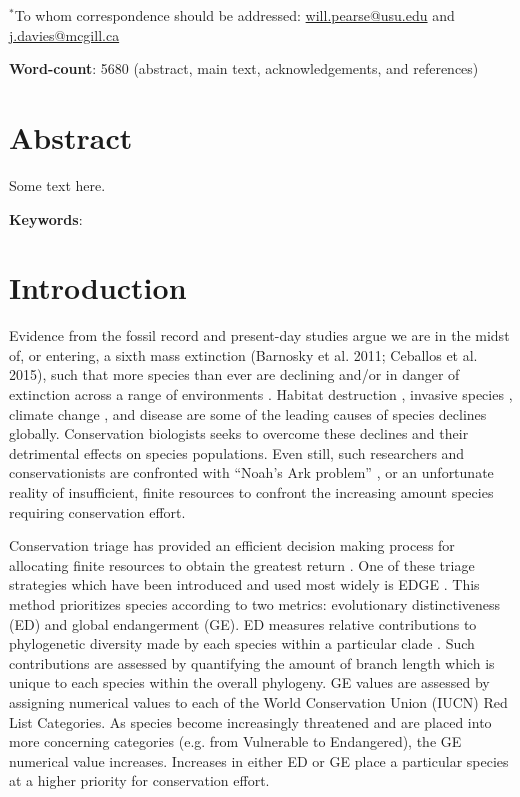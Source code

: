 \documentclass[12pt,english]{article}
\begin{document}
$^*$To whom correspondence should be addressed:
\url{will.pearse@usu.edu} and \url{j.davies@mcgill.ca}

\textbf{Word-count}: 5680 (abstract, main text, acknowledgements, and references)

\clearpage
\section*{Abstract}

Some text here.

\textbf{Keywords}: 

\clearpage
\section*{Introduction}
Evidence from the fossil record and present-day studies argue we are
in the midst of, or entering, a sixth mass extinction (Barnosky et
al. 2011; Ceballos et al. 2015), such that more species than ever are
declining and/or in danger of extinction across a range of
environments \autocite{Wake2008,Thomas2004}. Habitat destruction
\autocite{Brooks2002}, invasive species
\autocite{Miller1989,Molnar2008}, climate change
\autocite{Pounds2006}, and disease \autocite{Lips2006} are some of
the leading causes of species declines globally. Conservation
biologists seeks to overcome these declines and their detrimental
effects on species populations. Even still, such researchers and
conservationists are confronted with ``Noah's Ark problem''
\autocite{Weitzman1998}, or an unfortunate reality of insufficient,
finite resources to confront the increasing amount species requiring
conservation effort.

Conservation triage has provided an efficient decision making process
for allocating finite resources to obtain the greatest return
\autocite{Bottrill2008}. One of these triage strategies which have been
introduced and used most widely is EDGE \autocite{Isaac2006}. This
method prioritizes species according to two metrics: evolutionary
distinctiveness (ED) and global endangerment (GE). ED measures
relative contributions to phylogenetic diversity made by each species
within a particular clade \autocite{Isaac2006}. Such contributions are
assessed by quantifying the amount of branch length which is unique to
each species within the overall phylogeny. GE values are assessed by
assigning numerical values to each of the World Conservation Union
(IUCN) Red List Categories. As species become increasingly threatened
and are placed into more concerning categories (e.g. from Vulnerable
to Endangered), the GE numerical value increases. Increases in either
ED or GE place a particular species at a higher priority for
conservation effort.
\end{document}
